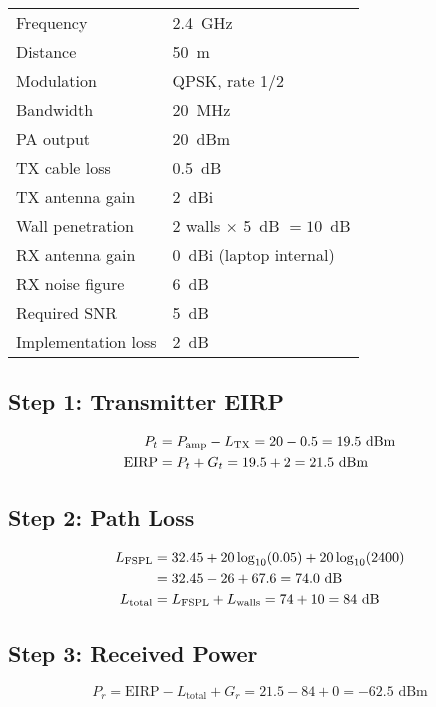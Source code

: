 \begin{tabular}{@{}ll@{}}
Frequency & 2.4~GHz \\
Distance & 50~m \\
Modulation & QPSK, rate 1/2 \\
Bandwidth & 20~MHz \\
PA output & 20~dBm \\
TX cable loss & 0.5~dB \\
TX antenna gain & 2~dBi \\
Wall penetration & 2 walls $\times$ 5~dB $= 10$~dB \\
RX antenna gain & 0~dBi (laptop internal) \\
RX noise figure & 6~dB \\
Required SNR & 5~dB \\
Implementation loss & 2~dB \\
\end{tabular}

\subsection*{Step 1: Transmitter EIRP}

\begin{align}
P_t &= P_{\text{amp}} - L_{\text{TX}} = 20 - 0.5 = 19.5\text{~dBm} \notag \\
\text{EIRP} &= P_t + G_t = 19.5 + 2 = 21.5\text{~dBm}
\label{eq:ex1-eirp}
\end{align}

\subsection*{Step 2: Path Loss}

\begin{align}
L_{\text{FSPL}} &= 32.45 + 20\log_{10}(0.05) + 20\log_{10}(2400) \notag \\
&= 32.45 - 26 + 67.6 = 74.0\text{~dB} \notag \\
L_{\text{total}} &= L_{\text{FSPL}} + L_{\text{walls}} = 74 + 10 = 84\text{~dB}
\label{eq:ex1-path-loss}
\end{align}

\subsection*{Step 3: Received Power}

\begin{equation}
P_r = \text{EIRP} - L_{\text{total}} + G_r = 21.5 - 84 + 0 = -62.5\text{~dBm}
\label{eq:ex1-rx-power}
\end{equation}

